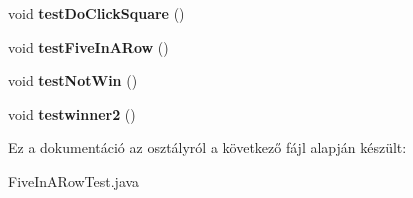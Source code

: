 \begin{DoxyCompactItemize}
void {\bfseries test\+Do\+Click\+Square} ()
\item 
\mbox{\label{class_five_in_a_row_1_1_five_in_a_row_test_a40fb948abfec7ccb9e6396f86c0d8f95}} 
void {\bfseries test\+Five\+In\+A\+Row} ()
\item 
\mbox{\label{class_five_in_a_row_1_1_five_in_a_row_test_afb9c4fc459a256280d4880ac931a972d}} 
void {\bfseries test\+Not\+Win} ()
\item 
\mbox{\label{class_five_in_a_row_1_1_five_in_a_row_test_a2ca297af28fbfd5afe21c08b8b38f91d}} 
void {\bfseries testwinner2} ()
\end{DoxyCompactItemize}


Ez a dokumentáció az osztályról a következő fájl alapján készült\+:\begin{DoxyCompactItemize}
\item 
Five\+In\+A\+Row\+Test.\+java\end{DoxyCompactItemize}
